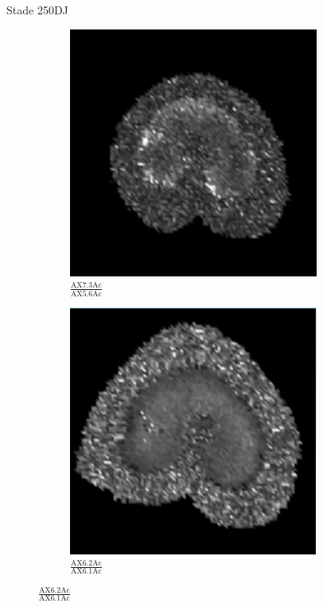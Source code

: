 \documentclass[10pt]{beamer}
\begin{document}
\begin{frame}{Stade 250DJ}
  \begin{figure}[ht]
    \centering
    \begin{subfigure}[t]{0.33\textwidth}
      \centering
      \includegraphics[width=0.9\textwidth]{fig/density_250_slice3}
      \caption{$\frac{\text{AX7.3Ac}}{\text{AX5.6Ac}}$}
      \label{subfig:density_250_slice3}
    \end{subfigure}%
    \begin{subfigure}[t]{0.33\textwidth}
      \centering
      \includegraphics[width=0.9\textwidth]{fig/density_250_slice4}
      \caption{$\frac{\text{AX6.2Ac}}{\text{AX6.1Ac}}$}
      \label{subfig:density_250_slice4}
    \end{subfigure}%

  \end{figure}


\end{frame}
\end{document}
